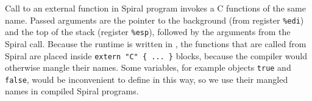 Call to an external function in Spiral program invokes a C functions of the
same name. Passed arguments are the pointer to the background (from register
\texttt{\%edi}) and the top of the stack (register \texttt{\%esp}), followed by
the arguments from the Spiral call. Because the runtime is written in
\Cplusplus{}, the functions that are called from Spiral are placed inside
\texttt{extern "C"~\{ ... \}} blocks, because the \Cplusplus{} compiler would
otherwise mangle their names. Some variables, for example objects \texttt{true}
and \texttt{false}, would be inconvenient to define in this way, so we use their
mangled names in compiled Spiral programs.
